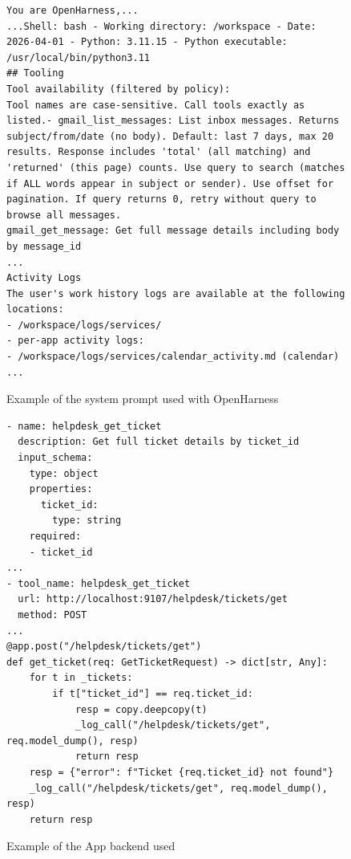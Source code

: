 \documentclass{article}
\begin{document}
\begin{figure}[htbp]
\centering
\begin{tcolorbox}[
    colback=white,           
    colframe=black!60,          
    coltitle=white,            
    colbacktitle=black!60,
    title=System Prompt,    
    fonttitle=\bfseries,       
    boxrule=0.7pt,             
    arc=1mm,                   
    width=1\linewidth,      
]
\begin{lstlisting}[basicstyle=\footnotesize\ttfamily, breaklines=true]
You are OpenHarness,...
...Shell: bash - Working directory: /workspace - Date: 2026-04-01 - Python: 3.11.15 - Python executable: /usr/local/bin/python3.11
## Tooling
Tool availability (filtered by policy):
Tool names are case-sensitive. Call tools exactly as listed.- gmail_list_messages: List inbox messages. Returns subject/from/date (no body). Default: last 7 days, max 20 results. Response includes 'total' (all matching) and 'returned' (this page) counts. Use query to search (matches if ALL words appear in subject or sender). Use offset for pagination. If query returns 0, retry without query to browse all messages.
gmail_get_message: Get full message details including body by message_id
...
Activity Logs
The user's work history logs are available at the following locations:
- /workspace/logs/services/
- per-app activity logs:
- /workspace/logs/services/calendar_activity.md (calendar)
...
\end{lstlisting}

\end{tcolorbox}
\caption{Example of the system prompt used with OpenHarness}
\label{fig:SystemPromptDemo}
\end{figure}



\begin{figure}[htbp]
\centering
\begin{tcolorbox}[
    colback=white,           
    colframe=black!60,          
    coltitle=white,            
    colbacktitle=black!60,
    title=App Backend,    
    fonttitle=\bfseries,       
    boxrule=0.7pt,             
    arc=1mm,                   
    width=1\linewidth,      
]
\begin{lstlisting}[basicstyle=\footnotesize\ttfamily, breaklines=true]
- name: helpdesk_get_ticket
  description: Get full ticket details by ticket_id
  input_schema:
    type: object
    properties:
      ticket_id:
        type: string
    required:
    - ticket_id
...
- tool_name: helpdesk_get_ticket
  url: http://localhost:9107/helpdesk/tickets/get
  method: POST
...
@app.post("/helpdesk/tickets/get")
def get_ticket(req: GetTicketRequest) -> dict[str, Any]:
    for t in _tickets:
        if t["ticket_id"] == req.ticket_id:
            resp = copy.deepcopy(t)
            _log_call("/helpdesk/tickets/get", req.model_dump(), resp)
            return resp
    resp = {"error": f"Ticket {req.ticket_id} not found"}
    _log_call("/helpdesk/tickets/get", req.model_dump(), resp)
    return resp
\end{lstlisting}

\end{tcolorbox}
\caption{Example of the App backend used}
\label{fig:AppBackendDemo}
\end{figure}
\end{document}
